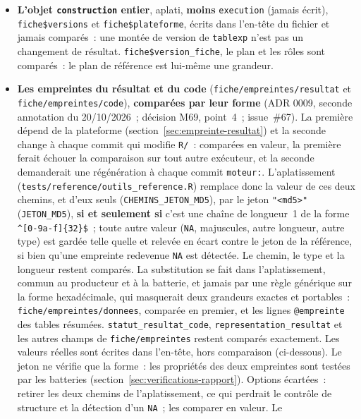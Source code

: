 \documentclass[a4paper,11pt]{article}
\newcommand{\code}[1]{\texttt{\small #1}}
\begin{document}
\begin{itemize}[leftmargin=*, itemsep=2pt]
  \item \sloppy \textbf{L'objet \code{construction} entier}, aplati, \textbf{moins}
    \code{execution} (jamais écrit), \code{fiche\$versions} et
    \code{fiche\$plateforme}, écrits dans l'en-tête du fichier et jamais
    comparés~: une montée de version de \code{tablexp} n'est pas un
    changement de résultat. \code{fiche\$version\_fiche}, le plan et les
    rôles sont comparés~: le plan de référence est lui-même une grandeur.
  \item \sloppy \textbf{Les empreintes du résultat et du code}
    (\code{fiche/empreintes/resultat} et \code{fiche/empreintes/code}),
    \textbf{comparées par leur forme} (ADR 0009, seconde annotation du
    20/10/2026~; décision M69, point~4~; issue~\#67). La première dépend de
    la plateforme (section~\ref{sec:empreinte-resultat}) et la seconde
    change à chaque commit qui modifie \code{R/}~: comparées en valeur, la
    première ferait échouer la comparaison sur tout autre exécuteur, et la
    seconde demanderait une régénération à chaque commit \code{moteur:}.
    L'aplatissement (\code{tests/reference/outils\_reference.R}) remplace
    donc la valeur de ces deux
    chemins, et d'eux seuls (\code{CHEMINS\_JETON\_MD5}), par le jeton
    \code{"<md5>"} (\code{JETON\_MD5}), \textbf{si et seulement si} c'est
    une chaîne de longueur~1 de la forme \verb|^[0-9a-f]{32}$|~; toute autre
    valeur (\code{NA}, majuscules, autre longueur, autre type) est gardée
    telle quelle et relevée en écart contre le jeton de la référence, si
    bien qu'une empreinte redevenue \code{NA} est détectée. Le chemin, le
    type et la longueur restent comparés. La substitution se fait dans
    l'aplatissement, commun au producteur et à la batterie, et jamais par
    une règle générique sur la forme hexadécimale, qui masquerait deux
    grandeurs exactes et portables~: \code{fiche/empreintes/donnees}, comparée
    en premier, et les lignes \code{@empreinte} des tables résumées.
    \code{statut\_resultat\_code}, \code{representation\_resultat} et les
    autres champs de \code{fiche/empreintes} restent comparés exactement. Les
    valeurs réelles sont écrites dans l'en-tête, hors comparaison
    (ci-dessous). Le jeton ne vérifie que la forme~: les propriétés des deux
    empreintes sont testées par les batteries
    (section~\ref{sec:verifications-rapport}). Options écartées~: retirer
    les deux chemins de l'aplatissement, ce qui perdrait le contrôle de
    structure et la détection d'un \code{NA}~; les comparer en valeur. Le

\end{itemize}
\end{document}
